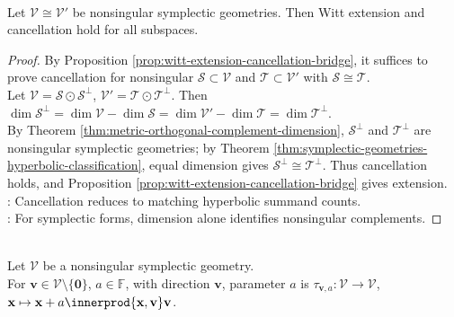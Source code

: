 \begin{theorem} \label{thm:symplectic-witt-extension-and-cancellation} \\
Let $\mathcal{V}\cong\mathcal{V}'$ be nonsingular symplectic geometries. Then Witt extension and cancellation hold for all subspaces.
\begin{proof}
By Proposition \ref{prop:witt-extension-cancellation-bridge}, it suffices to prove cancellation for nonsingular $\mathcal{S}\subset\mathcal{V}$ and $\mathcal{T}\subset\mathcal{V}'$ with $\mathcal{S}\cong\mathcal{T}$.\\
Let $\mathcal{V}=\mathcal{S}\odot\mathcal{S}^{\perp}$, $\mathcal{V}'=\mathcal{T}\odot\mathcal{T}^{\perp}$. Then $\dim\mathcal{S}^{\perp} =\dim\mathcal{V}-\dim\mathcal{S} =\dim\mathcal{V}'-\dim\mathcal{T} =\dim\mathcal{T}^{\perp}$.\\
By Theorem \ref{thm:metric-orthogonal-complement-dimension}, $\mathcal{S}^{\perp}$ and $\mathcal{T}^{\perp}$ are nonsingular symplectic geometries; by Theorem \ref{thm:symplectic-geometries-hyperbolic-classification}, equal dimension gives $\mathcal{S}^{\perp}\cong\mathcal{T}^{\perp}$. Thus cancellation holds, and Proposition \ref{prop:witt-extension-cancellation-bridge} gives extension.\\
: Cancellation reduces to matching hyperbolic summand counts.\\
: For symplectic forms, dimension alone identifies nonsingular complements.
\end{proof}
\end{theorem}

\begin{definition} \label{def:symplectic-transvection} \\
Let $\mathcal{V}$ be a nonsingular symplectic geometry.\\
For $\mathbf{v}\in\mathcal{V}\setminus\{\mathbf{0}\}$, $a\in\mathbb{F}$,  with direction $\mathbf{v}$, parameter $a$ is $\tau_{\mathbf{v},a}:\mathcal{V}\to\mathcal{V}$, $\mathbf{x}\mapsto\mathbf{x}+a\innerprod{\mathbf{x},\mathbf{v}}\mathbf{v}$.
\end{definition}

